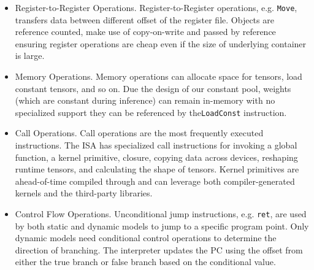 \begin{itemize}[leftmargin=*]
    \item Register-to-Register Operations. Register-to-Register operations, e.g. \texttt{Move}, transfers data between different offset of the register file. Objects are reference counted, make use of copy-on-write and passed by reference ensuring register operations are cheap even if the size of underlying container is large.

    \item Memory Operations. Memory operations can allocate space for tensors, load constant tensors, and so on. Due the design of our constant pool, weights (which are constant during inference) can remain in-memory with no specialized support they can be referenced by the\texttt{LoadConst} instruction.

    \item Call Operations. Call operations are the most frequently executed instructions. The ISA
    has specialized call instructions for invoking a global function, a kernel primitive, closure, copying data across devices, reshaping runtime tensors, and calculating the shape of tensors. Kernel primitives are ahead-of-time compiled through and can leverage both compiler-generated kernels and the third-party libraries.

    \item Control Flow Operations. Unconditional jump instructions, e.g. \texttt{ret}, are used by both static and dynamic models to jump to a specific program point. Only dynamic models need conditional control operations to determine the direction of branching. The interpreter updates the PC using the offset from either the true branch or false branch based on the conditional value.
\end{itemize}

